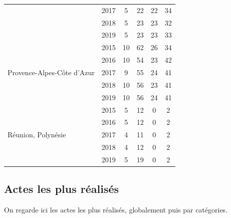\begin{table}[!t]
{\begin{tabular}{l|c|cccc}
   & 2017 &   5 &  22 &  22 &  34 \\ 
   & 2018 &   5 &  23 &  23 &  32 \\ 
   & 2019 &   5 &  23 &  23 &  33 \\ 
  \hline
  \multirow{5}{*}{Provence-Alpes-Côte d'Azur}    & 2015 &  10 &  62 &  26 &  34 \\ 
   & 2016 &  10 &  54 &  23 &  42 \\ 
   & 2017 &   9 &  55 &  24 &  41 \\ 
   & 2018 &  10 &  56 &  23 &  41 \\ 
   & 2019 &  10 &  56 &  24 &  41 \\  
   \hline
  \multirow{5}{*}{Réunion, Polynésie}    & 2015 &   5 &  12 &   0 &   2 \\ 
   & 2016 &   5 &  12 &   0 &   2 \\ 
   & 2017 &   4 &  11 &   0 &   2 \\ 
   & 2018 &   4 &  12 &   0 &   2 \\ 
   & 2019 &   5 &  19 &   0 &   2 \\ 
   \hline
\end{tabular}
}
\end{table}




\clearpage


\subsection{Actes les plus réalisés}

On regarde ici les actes les plus réalisés, globalement puis par catégories.


